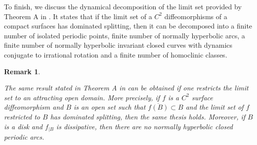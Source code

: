 \documentclass[a4paper,11pt]{article}
\newtheorem{theorem}{Theorem}
\newtheorem{remark}[lemma]{Remark}
\theoremstyle{definition}
\begin{document}
To finish, we discuss the dynamical decomposition of the limit set provided by Theorem A in \cite{PS2}. It states  that if the limit set of a $C^2$ diffeomorphisms of a compact surfaces has dominated splitting, then it can be decomposed into a finite number of isolated periodic points,  finite number of normally hyperbolic arcs, a finite number of normally hyperbolic invariant closed curves with dynamics conjugate to irrational rotation and a finite number of homoclinic classes. 
 
\begin{remark}\label{decomposition}
 
 The same result stated in Theorem A in \cite{PS2} can be obtained if one restricts the limit set to an attracting open domain. More precisely, if $f$ is a $C^2$ surface diffeomorphism and $B$ is an open set such that $\overline{f(B)}\subset B$ and the limit set of $f$ restricted to $B$ has dominated splitting, then the same thesis holds. Moreover, if $B$ is a disk and $f_{|B}$ is dissipative, then there are no normally hyperbolic closed periodic arcs.
    
\end{remark}




    




    
\end{document}
